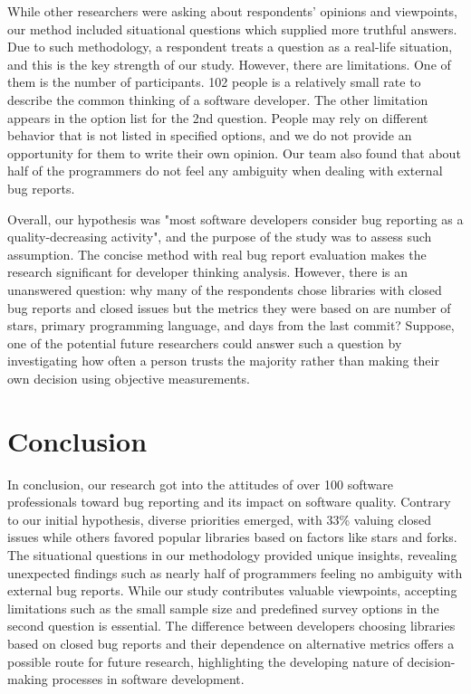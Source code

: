 \documentclass[11pt,review,sigplan,nonacm,natbib=false]{acmart}
\begin{document}
While other researchers were asking about respondents' opinions and viewpoints, our method included situational questions which supplied more truthful answers. Due to such methodology, a respondent treats a question as a real-life situation, and this is the key strength of our study. However, there are limitations. One of them is the number of participants. 102 people is a relatively small rate to describe the common thinking of a software developer. The other limitation appears in the option list for the 2nd question. People may rely on different behavior that is not listed in specified options, and we do not provide an opportunity for them to write their own opinion. Our team also found that about half of the programmers do not feel any ambiguity when dealing with external bug reports.


Overall, our hypothesis was "most software developers consider bug reporting as a quality-decreasing activity", and the purpose of the study was to assess such assumption. The concise method with real bug report evaluation makes the research significant for developer thinking analysis. However, there is an unanswered question: why many of the respondents chose libraries with closed bug reports and closed issues but the metrics they were based on are number of stars, primary programming language, and days from the last commit? Suppose, one of the potential future researchers could answer such a question by investigating how often a person trusts the majority rather than making their own decision using objective measurements.
 
\section{Conclusion}

In conclusion, our research got into the attitudes of over 100 software professionals toward bug reporting and its impact on software quality. Contrary to our initial hypothesis, diverse priorities emerged, with 33\% valuing closed issues while others favored popular libraries based on factors like stars and forks. The situational questions in our methodology provided unique insights, revealing unexpected findings such as nearly half of programmers feeling no ambiguity with external bug reports. While our study contributes valuable viewpoints, accepting limitations such as the small sample size and predefined survey options in the second question is essential. The difference between developers choosing libraries based on closed bug reports and their dependence on alternative metrics offers a possible route for future research, highlighting the developing nature of decision-making processes in software development.

\printbibliography
\end{document}
